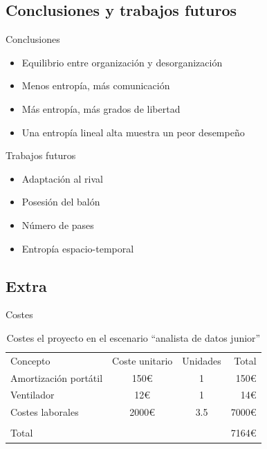 \documentclass{beamer}
\begin{document}
%
\subsection{Conclusiones y trabajos futuros}

\begin{frame}{Conclusiones}
	\begin{itemize}
		\item Equilibrio entre organización y desorganización
		\item Menos entropía, más comunicación
		\item Más entropía, más grados de libertad 
		\item Una entropía lineal alta muestra un peor desempeño
	\end{itemize}
\end{frame}

\begin{frame}{Trabajos futuros}
	\begin{itemize}
		\item Adaptación al rival
		\item Posesión del balón
		\item Número de pases
		\item Entropía espacio-temporal
	\end{itemize}
\end{frame}

\subsection{Extra}

\begin{frame}{Costes}
	\begin{table}
		\begin{tabular}[h!tbp]{lccr}
		  Concepto & Coste unitario & Unidades & Total \\
		  Amortización portátil & 150€ & 1 & 150€ \\
		  Ventilador            & 12€  & 1 & 14€ \\
		  Costes laborales      & 2000€& 3.5 & 7000€ \\
		  \hline \\
		  \multicolumn{3}{l}{Total} & 7164€ \\
		\end{tabular}
		\caption{Costes el proyecto en el escenario ``analista de datos junior''} \label{tab:costes2}
	\end{table}
\end{frame}
\end{document}
